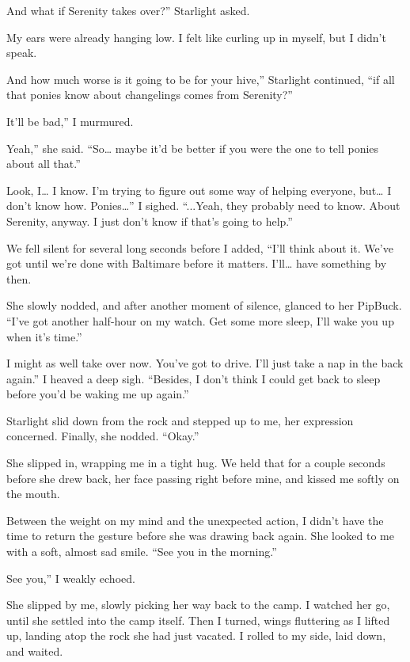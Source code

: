 \leavevmode{}And what if Serenity takes over?” Starlight asked.

My ears were already hanging low. I felt like curling up in myself, but I didn’t speak.

\leavevmode{}And how much worse is it going to be for your hive,” Starlight continued, “if all that ponies know about changelings comes from Serenity?”

\leavevmode{}It’ll be bad,” I murmured.

\leavevmode{}Yeah,” she said. “So… maybe it’d be better if you were the one to tell ponies about all that.”

\leavevmode{}Look, I… I know. I’m trying to figure out some way of helping everyone, but… I don’t know how. Ponies…” I sighed. “...Yeah, they probably need to know. About Serenity, anyway. I just don’t know if that’s going to help.”

We fell silent for several long seconds before I added, “I’ll think about it. We’ve got until we’re done with Baltimare before it matters. I’ll… have something by then.

She slowly nodded, and after another moment of silence, glanced to her PipBuck. “I’ve got another half-hour on my watch. Get some more sleep, I’ll wake you up when it’s time.”

\leavevmode{}I might as well take over now. You’ve got to drive. I’ll just take a nap in the back again.” I heaved a deep sigh. “Besides, I don’t think I could get back to sleep before you’d be waking me up again.”

Starlight slid down from the rock and stepped up to me, her expression concerned. Finally, she nodded. “Okay.”

She slipped in, wrapping me in a tight hug. We held that for a couple seconds before she drew back, her face passing right before mine, and kissed me softly on the mouth.

Between the weight on my mind and the unexpected action, I didn’t have the time to return the gesture before she was drawing back again. She looked to me with a soft, almost sad smile. “See you in the morning.”

\leavevmode{}See you,” I weakly echoed.

She slipped by me, slowly picking her way back to the camp. I watched her go, until she settled into the camp itself. Then I turned, wings fluttering as I lifted up, landing atop the rock she had just vacated. I rolled to my side, laid down, and waited.

